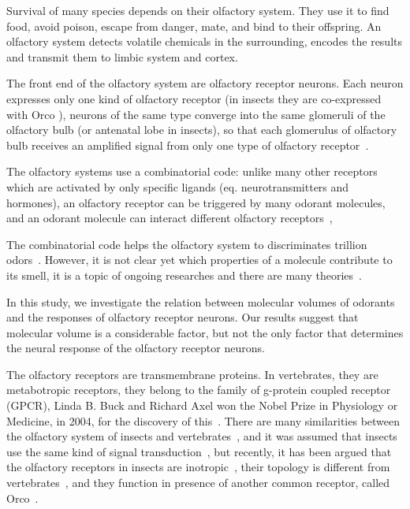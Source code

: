 \documentclass[11pt]{article} %
\begin{document}
Survival of many species depends on their olfactory system. 
They use it  to find food, 
avoid poison, 
escape from danger, 
mate, 
and bind to their offspring.
An olfactory system detects volatile chemicals in the surrounding, 
encodes the results and transmit them to limbic system and cortex.

The front end of the olfactory system are olfactory receptor neurons.  
Each neuron expresses only one kind of olfactory receptor (in insects they are co-expressed with Orco \cite{Larsson2004}),
neurons of the same type converge into the same glomeruli of the olfactory bulb (or antenatal lobe in insects),
so that each glomerulus of olfactory bulb receives an amplified signal from only one type of olfactory receptor~\cite{root2007,Carey2011,Vosshall2000,Couto2005,fishilevich2005,gao2000,wang1998,mombaerts1996,vassar1994}.

The olfactory systems use a combinatorial code: 
unlike many other receptors which are activated by only specific ligands (eq. neurotransmitters and hormones),
an olfactory receptor can be triggered by many odorant molecules, 
and an odorant molecule can interact different olfactory receptors~\cite{Malnic2000},

The combinatorial code helps the olfactory system to discriminates trillion odors~\cite{Bushdid2014}.
However, it is not clear yet which properties of a molecule contribute to its smell,
it is a topic of ongoing researches and there are many theories~\cite{Turin,Keller2004,Araneda2000,Brookes2007,Franco2011,Pelz2006,Gabler2013,Schmuker2007,Haddad2008,Snitz2013,Yablonka2012,gane2013}.

In this study, 
we investigate the relation between molecular volumes of odorants and the responses of olfactory receptor neurons. 
Our results suggest that molecular volume is a considerable factor, 
but not the only factor that determines the neural response of the olfactory receptor neurons.

The olfactory receptors are transmembrane proteins.
In vertebrates, they are metabotropic receptors, they belong to the family of g-protein coupled receptor (GPCR), 
Linda B. Buck and Richard Axel won the Nobel Prize in Physiology or Medicine, in 2004, 
for the discovery of this~\cite{Buck1991}.
There are many similarities between the olfactory system of insects and vertebrates~\cite{Wilson2014,Kaupp2010}, 
and it was assumed that insects use the same kind of signal transduction~\cite{Brody2000,Hill04102002}, 
but recently, it has been argued that the olfactory receptors in insects are inotropic~\cite{Sato2008,Wicher2008,Nagel2011,Rong2011}, 	
their topology is different from vertebrates~\cite{Benton2007,Smart2008},
and they function in presence of another common receptor, called Orco~\cite{Larsson2004}.
\end{document}
